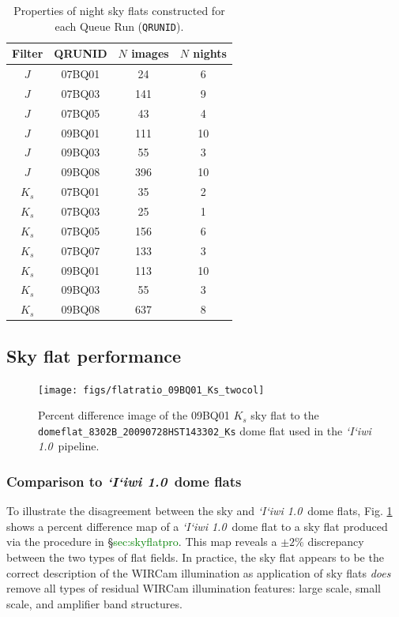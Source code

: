 \documentclass[iop]{emulateapj}
\newcommand{\sw}[1]{\textit{#1}} %
\newcommand{\iiwione}{\sw{`I`iwi 1.0}}
\newcommand{\todo}[1]{\textcolor{green}{#1}} %
\begin{document}
\begin{table}[t]
    \centering
    \caption{Properties of night sky flats constructed for each Queue Run (\texttt{QRUNID}).}
    \label{tab:flattable}

\begin{tabular}{cccc}
\hline
Filter & QRUNID & $N$ images & $N$ nights \\
\hline
$J$ & 07BQ01 & 24 & 6 \\
$J$ & 07BQ03 & 141 & 9 \\
$J$ & 07BQ05 & 43 & 4 \\
$J$ & 09BQ01 & 111 & 10 \\
$J$ & 09BQ03 & 55 & 3 \\
$J$ & 09BQ08 & 396 & 10 \\
\hline
$K_s$ & 07BQ01 & 35 & 2 \\
$K_s$ & 07BQ03 & 25 & 1 \\
$K_s$ & 07BQ05 & 156 & 6 \\
$K_s$ & 07BQ07 & 133 & 3 \\
$K_s$ & 09BQ01 & 113 & 10 \\
$K_s$ & 09BQ03 & 55 & 3 \\
$K_s$ & 09BQ08 & 637 & 8 \\
\hline
\end{tabular}
\end{table}

\subsection{Sky flat performance}
\label{sec:skyflatstats}

\begin{figure}[t]
   \centering
    \texttt{[image: figs/flatratio\_09BQ01\_Ks\_twocol]}
   \caption{Percent difference image of the 09BQ01 $K_s$ sky flat to the \texttt{domeflat\_8302B\_20090728HST143302\_Ks} dome flat used in the \iiwione\ pipeline.}
   \label{fig:domeflatratio}
\end{figure}

\subsubsection{Comparison to \iiwione\ dome flats}


To illustrate the disagreement between the sky and \iiwione\ dome flats, Fig. \ref{fig:domeflatratio} shows a percent difference map of a \iiwione\ dome flat to a sky flat produced via the procedure in \S \todo{sec:skyflatpro}. This map reveals a $\pm2\%$ discrepancy between the two types of flat fields.
In practice, the sky flat appears to be the correct description of the WIRCam illumination as application of sky flats \emph{does} remove all types of residual WIRCam illumination features: large scale, small scale, and amplifier band structures.
\end{document}
